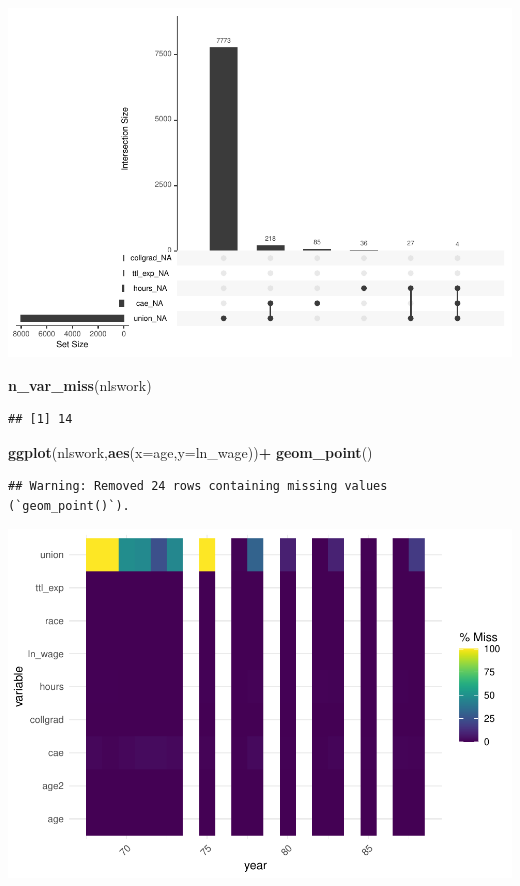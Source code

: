 \documentclass[
]{article}
\newenvironment{Shaded}{\begin{snugshade}}{\end{snugshade}}
\newcommand{\AttributeTok}[1]{\textcolor[rgb]{0.13,0.29,0.53}{#1}}
\newcommand{\FunctionTok}[1]{\textcolor[rgb]{0.13,0.29,0.53}{\textbf{#1}}}
\newcommand{\NormalTok}[1]{#1}
\newcommand{\SpecialCharTok}[1]{\textcolor[rgb]{0.81,0.36,0.00}{\textbf{#1}}}
\begin{document}
\includegraphics{RIntro_files/figure-latex/unnamed-chunk-8-2.pdf}

\begin{Shaded}
\begin{Highlighting}[]
\FunctionTok{n\_var\_miss}\NormalTok{(nlswork)}
\end{Highlighting}
\end{Shaded}

\begin{verbatim}
## [1] 14
\end{verbatim}

\begin{Shaded}
\begin{Highlighting}[]
\FunctionTok{ggplot}\NormalTok{(nlswork,}\FunctionTok{aes}\NormalTok{(}\AttributeTok{x=}\NormalTok{age,}\AttributeTok{y=}\NormalTok{ln\_wage))}\SpecialCharTok{+}
  \FunctionTok{geom\_point}\NormalTok{()}
\end{Highlighting}
\end{Shaded}

\begin{verbatim}
## Warning: Removed 24 rows containing missing values (`geom_point()`).
\end{verbatim}

\includegraphics{RIntro_files/figure-latex/unnamed-chunk-9-1.pdf}
\end{document}
